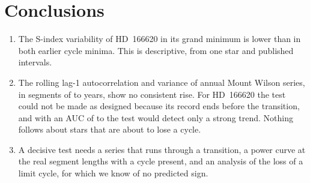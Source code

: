 \section{Conclusions}

\begin{enumerate}
\item The S-index variability of HD~166620 in its grand minimum is lower than in both earlier cycle minima. This is descriptive, from one star and published intervals.
\item The rolling lag-1 autocorrelation and variance of annual Mount Wilson series, in \NSegments{} segments of \LMin{} to \NSunYears{} years, show no consistent rise. For HD~166620 the test could not be made as designed because its record ends before the transition, and with an AUC of \AUCTwentyFour{} to \AUCForty{} the test would detect only a strong trend. Nothing follows about stars that are about to lose a cycle.
\item A decisive test needs a series that runs through a transition, a power curve at the real segment lengths with a cycle present, and an analysis of the loss of a limit cycle, for which we know of no predicted sign.
\end{enumerate}
